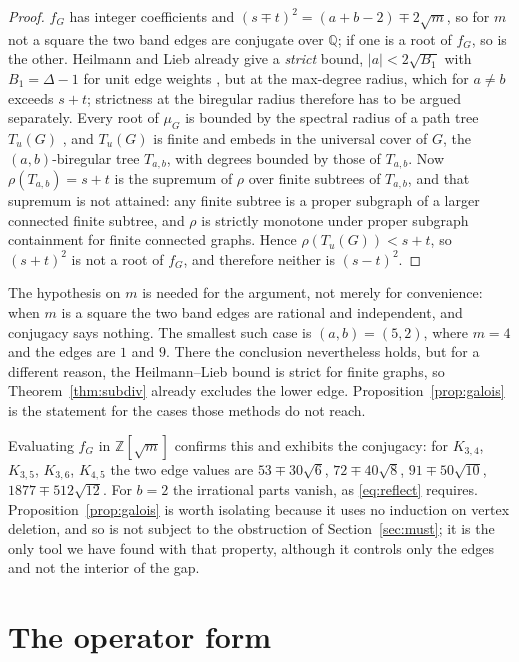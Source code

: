 \documentclass[11pt]{article}
\theoremstyle{remark}
\begin{document}
\begin{proof}
$f_G$ has integer coefficients and $(s\mp t)^2=(a+b-2)\mp2\sqrt m$, so for $m$
not a square the two band edges are conjugate over $\mathbb Q$; if one is a root
of $f_G$, so is the other. Heilmann and Lieb already give a \emph{strict} bound,
$|a|<2\sqrt{B_1}$ with $B_1=\Delta-1$ for unit edge weights \cite[Thm.~4.3]{HL},
but at the max-degree radius, which for $a\ne b$ exceeds $s+t$; strictness at the
biregular radius therefore has to be argued separately. Every root of $\mu_G$ is
bounded by the spectral
radius of a path tree $T_u(G)$ \cite{God81}, and $T_u(G)$ is finite and embeds
in the universal cover of $G$, the $(a,b)$-biregular tree $T_{a,b}$, with
degrees bounded by those of $T_{a,b}$. Now $\rho(T_{a,b})=s+t$ is the supremum
of $\rho$ over finite subtrees of $T_{a,b}$, and that supremum is not attained:
any finite subtree is a proper subgraph of a larger connected finite subtree,
and $\rho$ is strictly monotone under proper subgraph containment for finite
connected graphs. Hence $\rho(T_u(G))<s+t$, so $(s+t)^2$ is not a root of
$f_G$, and therefore neither is $(s-t)^2$.
\end{proof}

The hypothesis on $m$ is needed for the argument, not merely for convenience:
when $m$ is a square the two band edges are rational and independent, and
conjugacy says nothing. The smallest such case is $(a,b)=(5,2)$, where $m=4$
and the edges are $1$ and $9$. There the conclusion nevertheless holds, but for
a different reason, the Heilmann--Lieb bound is strict for finite graphs, so
Theorem~\ref{thm:subdiv} already excludes the lower edge. Proposition~\ref{prop:galois}
is the statement for the cases those methods do not reach.

Evaluating $f_G$ in $\mathbb Z[\sqrt m]$ confirms this and exhibits the
conjugacy: for $K_{3,4}$, $K_{3,5}$, $K_{3,6}$, $K_{4,5}$ the two edge values
are $53\mp30\sqrt6$, $72\mp40\sqrt8$, $91\mp50\sqrt{10}$, $1877\mp512\sqrt{12}$.
For $b=2$ the irrational parts vanish, as \eqref{eq:reflect} requires.
Proposition~\ref{prop:galois} is worth isolating because it uses no induction on
vertex deletion, and so is not subject to the obstruction of
Section~\ref{sec:must}; it is
the only tool we have found with that property, although it controls only the
edges and not the interior of the gap.

\section{The operator form}
\end{document}
